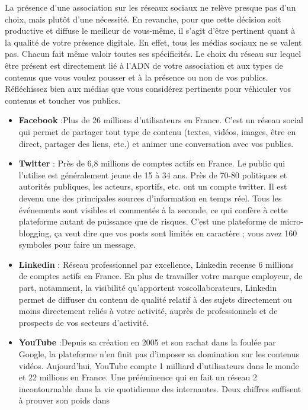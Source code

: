 \documentclass[12pt,a4paper,titlepage]{article}
\begin{document}
La présence
d’une association sur les réseaux sociaux ne relève presque pas d’un choix, mais plutôt d’une nécessité.
En revanche, pour que cette décision soit productive et diffuse le meilleur de vous-même, il s’agit d’être
pertinent quant à la qualité de votre présence digitale. En effet, tous les médias sociaux ne se valent pas.
Chacun fait même valoir toutes ses spécificités. Le choix du réseau sur lequel être présent est
directement lié à l’ADN de votre association et aux types de contenus que vous voulez pousser et à la
présence ou non de vos publics. Réfléchissez bien aux médias que vous considérez pertinents pour
véhiculer vos contenus et toucher vos publics. \newline
\begin{itemize}
    \item \textbf{Facebook} :Plus de 26 millions d’utilisateurs en France. C’est un réseau social qui permet de partager
tout type de contenu (textes, vidéos, images, être en direct, partager des liens, etc.) et animer une
conversation avec vos publics.
    \item \textbf{Twitter} : Près de 6,8 millions de comptes actifs en France. Le public qui l’utilise est généralement
jeune de 15 à 34 ans. Près de 70-80%
politiques et autorités publiques, les acteurs, sportifs, etc. ont un compte twitter. Il est devenu une des
principales sources d’information en temps réel. Tous les événements sont visibles et commentés à la
seconde, ce qui confère à cette plateforme autant de puissance que de risques. C’est une plateforme de
micro-blogging, ça veut dire que vos posts sont limités en caractère ; vous avez 160 symboles pour faire
un message.
    \item \textbf{Linkedin} : Réseau professionnel par excellence, Linkedin recense 6 millions de comptes actifs en
France. En plus de travailler votre marque employeur, de part, notamment, la visibilité qu’apportent
voscollaborateurs, Linkedin permet de diffuser du contenu de qualité relatif à des sujets directement ou
moins directement reliés à votre activité, auprès de professionnels et de prospects de vos secteurs
d’activité.
    \item \textbf{YouTube} :Depuis sa création en 2005 et son rachat dans la foulée par Google, la plateforme n’en finit
pas d’imposer sa domination sur les contenus vidéos. Aujourd’hui, YouTube compte 1 milliard
d’utilisateurs dans le monde et 22 millions en France. Une prééminence qui en fait un réseau 2
incontournable dans la vie quotidienne des internautes. Deux chiffres suffisent à prouver son poids dans

\end{itemize}
\end{document}
